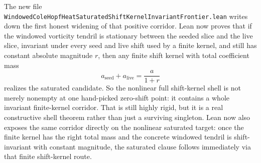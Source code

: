 \documentclass[11pt]{article}
\begin{document}
The new file
\texttt{WindowedColeHopfHeatSaturatedShiftKernelInvariantFrontier.lean}
writes down the first honest widening of that positive corridor.  Lean now
proves that if the windowed vorticity tendril is stationary between the seeded
slice and the live slice, invariant under every seed and live shift used by a
finite kernel, and still has constant absolute magnitude \(r\), then any
finite shift kernel with total coefficient mass
\[
  a_{\mathrm{seed}} + a_{\mathrm{live}} = \frac{a}{1+r}
\]
realizes the saturated candidate.  So the nonlinear full shift-kernel shell is
not merely nonempty at one hand-picked zero-shift point: it contains a whole
invariant finite-kernel corridor.  That is still highly rigid, but it is a
real constructive shell theorem rather than just a surviving singleton.  Lean
now also exposes the same corridor directly on the nonlinear saturated target:
once the finite kernel has the right total mass and the concrete windowed
tendril is shift-invariant with constant magnitude, the saturated clause
follows immediately via that finite shift-kernel route.
\end{document}
